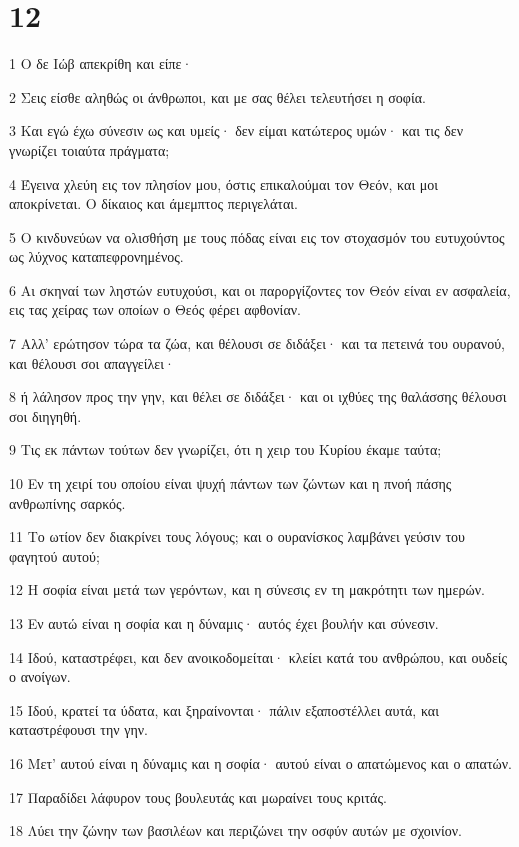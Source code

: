 \chapter{12}

\par 1 Ο δε Ιώβ απεκρίθη και είπε·
\par 2 Σεις είσθε αληθώς οι άνθρωποι, και με σας θέλει τελευτήσει η σοφία.
\par 3 Και εγώ έχω σύνεσιν ως και υμείς· δεν είμαι κατώτερος υμών· και τις δεν γνωρίζει τοιαύτα πράγματα;
\par 4 Έγεινα χλεύη εις τον πλησίον μου, όστις επικαλούμαι τον Θεόν, και μοι αποκρίνεται. Ο δίκαιος και άμεμπτος περιγελάται.
\par 5 Ο κινδυνεύων να ολισθήση με τους πόδας είναι εις τον στοχασμόν του ευτυχούντος ως λύχνος καταπεφρονημένος.
\par 6 Αι σκηναί των ληστών ευτυχούσι, και οι παροργίζοντες τον Θεόν είναι εν ασφαλεία, εις τας χείρας των οποίων ο Θεός φέρει αφθονίαν.
\par 7 Αλλ' ερώτησον τώρα τα ζώα, και θέλουσι σε διδάξει· και τα πετεινά του ουρανού, και θέλουσι σοι απαγγείλει·
\par 8 ή λάλησον προς την γην, και θέλει σε διδάξει· και οι ιχθύες της θαλάσσης θέλουσι σοι διηγηθή.
\par 9 Τις εκ πάντων τούτων δεν γνωρίζει, ότι η χειρ του Κυρίου έκαμε ταύτα;
\par 10 Εν τη χειρί του οποίου είναι ψυχή πάντων των ζώντων και η πνοή πάσης ανθρωπίνης σαρκός.
\par 11 Το ωτίον δεν διακρίνει τους λόγους; και ο ουρανίσκος λαμβάνει γεύσιν του φαγητού αυτού;
\par 12 Η σοφία είναι μετά των γερόντων, και η σύνεσις εν τη μακρότητι των ημερών.
\par 13 Εν αυτώ είναι η σοφία και η δύναμις· αυτός έχει βουλήν και σύνεσιν.
\par 14 Ιδού, καταστρέφει, και δεν ανοικοδομείται· κλείει κατά του ανθρώπου, και ουδείς ο ανοίγων.
\par 15 Ιδού, κρατεί τα ύδατα, και ξηραίνονται· πάλιν εξαποστέλλει αυτά, και καταστρέφουσι την γην.
\par 16 Μετ' αυτού είναι η δύναμις και η σοφία· αυτού είναι ο απατώμενος και ο απατών.
\par 17 Παραδίδει λάφυρον τους βουλευτάς και μωραίνει τους κριτάς.
\par 18 Λύει την ζώνην των βασιλέων και περιζώνει την οσφύν αυτών με σχοινίον.
